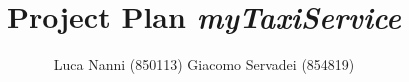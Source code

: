 \documentclass[a4paper]{report}
\begin{document}
\title{\textbf{P}roject \textbf{P}lan
\linebreak
		{\Huge\textit{\textbf{myTaxiService}}}
		}
\author{Luca Nanni (850113) \linebreak
	Giacomo Servadei (854819)}
\maketitle

\tableofcontents
\listoffigures
\listoftables



	

\end{document}
